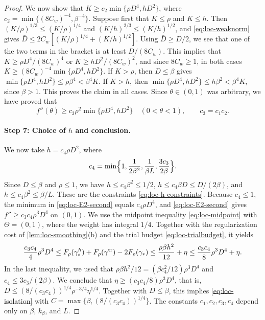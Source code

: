\begin{proof}
We now show that $K\ge c_2\min\{\rho D^4,hD^2\}$, where
$c_2=\min\{(8C_w)^{-4},\beta^{-4}\}$. Suppose first that $K\le\rho$ and $K\le
h$. Then $(K/\rho)^{1/3}\le(K/\rho)^{1/4}$ and $(K/h)^{2/3}\le(K/h)^{1/2}$,
and \eqref{eq:loc-weaknorm} gives
$\bar D\le2C_w[(K/\rho)^{1/4}+(K/h)^{1/2}]$. Using $\bar D\ge D/2$, we see that one
of the two terms in the bracket is at least $D/(8C_w)$. This implies that
$K\ge\rho D^4/(8C_w)^4$ or $K\ge hD^2/(8C_w)^2$, and since $8C_w\ge1$, in both cases
$K\ge(8C_w)^{-4}\min\{\rho D^4,hD^2\}$. If $K>\rho$, then $D\le\beta$ gives
$\min\{\rho D^4,hD^2\}\le\rho\beta^4<\beta^4K$. If $K>h$, then
$\min\{\rho D^4,hD^2\}\le h\beta^2<\beta^4K$, since $\beta>1$. This proves the
claim in all cases. Since $\theta\in(0,1)$ was arbitrary, we have proved that
\begin{equation}\label{eq:loc-E2-second}
 f''(\theta)\ge c_3\rho^2\min\{\rho D^4,hD^2\}
 \quad(0<\theta<1),\qquad c_3=c_1c_2 .
\end{equation}

\paragraph{Step 7: Choice of $h$ and conclusion.}
We now take $h=c_4\rho D^2$, where
\[
 c_4=\min\Bigl\{1,\frac1{2\beta^2},\frac1{\beta L},\frac{3c_3}{2\beta}\Bigr\}.
\]
Since $D\le\beta$ and $\rho\le1$, we have $h\le c_4\beta^2\le1/2$,
$h\le c_4\beta D\le D/(2\beta)$, and $h\le c_4\beta^2\le\beta/L$. These are the
constraints \eqref{eq:loc-h-constraints}. Because $c_4\le1$, the minimum in
\eqref{eq:loc-E2-second} equals $c_4\rho D^4$, and \eqref{eq:loc-E2-second}
gives $f''\ge c_3c_4\rho^3D^4$ on $(0,1)$. We use the midpoint inequality
\eqref{eq:loc-midpoint} with $\Theta=(0,1)$, where the weight has integral
$1/4$. Together with the regularization cost of \cref{lem:loc-smoothing}(b)
and the trial budget \eqref{eq:loc-trialbudget}, it yields
\[
 \frac{c_3c_4}{4}\rho^3D^4
 \le F_\rho(\gamma_*^h)+F_\rho(\gamma^{\rm tr})-2F_\rho(\gamma_*)
 \le\frac{\rho\beta h^2}{12}+\eta
 \le\frac{c_3c_4}{8}\rho^3D^4+\eta .
\]
In the last inequality, we used that $\rho\beta h^2/12=(\beta
c_4^2/12)\rho^3D^4$ and $c_4\le3c_3/(2\beta)$. We conclude that
$\eta\ge(c_3c_4/8)\rho^3D^4$, that is,
$D\le(8/(c_3c_4))^{1/4}\rho^{-3/4}\eta^{1/4}$. Together with $D\le\beta$, this
implies \eqref{eq:loc-isolation} with
$C=\max\{\beta,(8/(c_3c_4))^{1/4}\}$. The constants $c_1,c_2,c_3,c_4$ depend
only on $\beta$, $k_\beta$, and $L$.
\end{proof}
